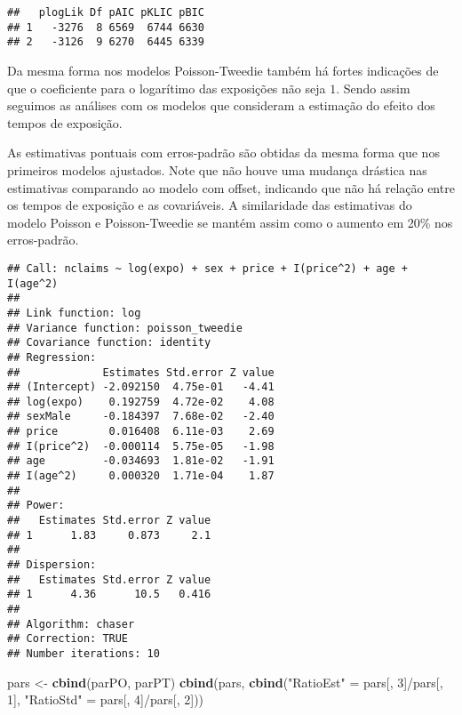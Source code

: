 \documentclass[9pt,a5paper,]{book}
\newenvironment{Shaded}{}{}
\newcommand{\KeywordTok}[1]{\textbf{{#1}}}
\newcommand{\DecValTok}[1]{{#1}}
\newcommand{\StringTok}[1]{{#1}}
\newcommand{\NormalTok}[1]{{#1}}
\renewenvironment{Shaded}{\color{inputcolor}}{}
\theoremstyle{definition}
\theoremstyle{definition}
\theoremstyle{remark}
\begin{document}
\begin{verbatim}
##   plogLik Df pAIC pKLIC pBIC
## 1   -3276  8 6569  6744 6630
## 2   -3126  9 6270  6445 6339
\end{verbatim}

Da mesma forma nos modelos Poisson-Tweedie também há fortes indicações
de que o coeficiente para o logarítimo das exposições não seja \(1\).
Sendo assim seguimos as análises com os modelos que consideram a
estimação do efeito dos tempos de exposição.

As estimativas pontuais com erros-padrão são obtidas da mesma forma que
nos primeiros modelos ajustados. Note que não houve uma mudança drástica
nas estimativas comparando ao modelo com offset, indicando que não há
relação entre os tempos de exposição e as covariáveis. A similaridade
das estimativas do modelo Poisson e Poisson-Tweedie se mantém assim como
o aumento em 20\% nos erros-padrão.

\begin{Shaded}
\end{Shaded}

\begin{verbatim}
## Call: nclaims ~ log(expo) + sex + price + I(price^2) + age + I(age^2)
## 
## Link function: log
## Variance function: poisson_tweedie
## Covariance function: identity
## Regression:
##             Estimates Std.error Z value
## (Intercept) -2.092150  4.75e-01   -4.41
## log(expo)    0.192759  4.72e-02    4.08
## sexMale     -0.184397  7.68e-02   -2.40
## price        0.016408  6.11e-03    2.69
## I(price^2)  -0.000114  5.75e-05   -1.98
## age         -0.034693  1.81e-02   -1.91
## I(age^2)     0.000320  1.71e-04    1.87
## 
## Power:
##   Estimates Std.error Z value
## 1      1.83     0.873     2.1
## 
## Dispersion:
##   Estimates Std.error Z value
## 1      4.36      10.5   0.416
## 
## Algorithm: chaser
## Correction: TRUE
## Number iterations: 10
\end{verbatim}

\begin{Shaded}
\begin{Highlighting}[]
\NormalTok{pars <-}\StringTok{ }\KeywordTok{cbind}\NormalTok{(parPO, parPT)}
\KeywordTok{cbind}\NormalTok{(pars, }\KeywordTok{cbind}\NormalTok{(}\StringTok{"RatioEst"} \NormalTok{=}\StringTok{ }\NormalTok{pars[, }\DecValTok{3}\NormalTok{]/pars[, }\DecValTok{1}\NormalTok{],}
                  \StringTok{"RatioStd"} \NormalTok{=}\StringTok{ }\NormalTok{pars[, }\DecValTok{4}\NormalTok{]/pars[, }\DecValTok{2}\NormalTok{]))}
\end{Highlighting}
\end{Shaded}
\end{document}
